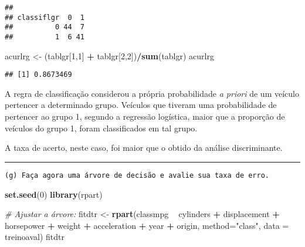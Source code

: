 \documentclass[]{article}
\newenvironment{Shaded}{\begin{snugshade}}{\end{snugshade}}
\newcommand{\KeywordTok}[1]{\textcolor[rgb]{0.13,0.29,0.53}{\textbf{#1}}}
\newcommand{\DataTypeTok}[1]{\textcolor[rgb]{0.13,0.29,0.53}{#1}}
\newcommand{\DecValTok}[1]{\textcolor[rgb]{0.00,0.00,0.81}{#1}}
\newcommand{\StringTok}[1]{\textcolor[rgb]{0.31,0.60,0.02}{#1}}
\newcommand{\CommentTok}[1]{\textcolor[rgb]{0.56,0.35,0.01}{\textit{#1}}}
\newcommand{\OperatorTok}[1]{\textcolor[rgb]{0.81,0.36,0.00}{\textbf{#1}}}
\newcommand{\NormalTok}[1]{#1}
\begin{document}
\begin{verbatim}
##           
## classiflgr  0  1
##          0 44  7
##          1  6 41
\end{verbatim}

\begin{Shaded}
\begin{Highlighting}[]
\NormalTok{acurlrg <-}\StringTok{ }\NormalTok{(tablgr[}\DecValTok{1}\NormalTok{,}\DecValTok{1}\NormalTok{] }\OperatorTok{+}\StringTok{ }\NormalTok{tablgr[}\DecValTok{2}\NormalTok{,}\DecValTok{2}\NormalTok{])}\OperatorTok{/}\KeywordTok{sum}\NormalTok{(tablgr)}
\NormalTok{acurlrg}
\end{Highlighting}
\end{Shaded}

\begin{verbatim}
## [1] 0.8673469
\end{verbatim}

\begin{Shaded}
\end{Shaded}

A regra de classificação considerou a própria probabilidade \emph{a
priori} de um veículo pertencer a determinado grupo. Veículos que
tiveram uma probabilidade de pertencer ao grupo 1, segundo a regressão
logística, maior que a proporção de veículos do grupo 1, foram
classificados em tal grupo.

A taxa de acerto, neste caso, foi maior que o obtido da análise
discriminante.

\begin{center}\rule{0.5\linewidth}{\linethickness}\end{center}

\begin{verbatim}
(g) Faça agora uma árvore de decisão e avalie sua taxa de erro.
\end{verbatim}

\begin{Shaded}
\begin{Highlighting}[]
\KeywordTok{set.seed}\NormalTok{(}\DecValTok{0}\NormalTok{)}
\KeywordTok{library}\NormalTok{(rpart)}

\CommentTok{# Ajustar a árvore:}
\NormalTok{fitdtr <-}\StringTok{ }\KeywordTok{rpart}\NormalTok{(classmpg }\OperatorTok{~}\StringTok{ }\NormalTok{cylinders }\OperatorTok{+}\StringTok{ }\NormalTok{displacement }\OperatorTok{+}\StringTok{ }\NormalTok{horsepower }\OperatorTok{+}\StringTok{ }\NormalTok{weight }\OperatorTok{+}\StringTok{ }\NormalTok{acceleration }\OperatorTok{+}\StringTok{ }\NormalTok{year }\OperatorTok{+}\StringTok{ }\NormalTok{origin,}
             \DataTypeTok{method=}\StringTok{"class"}\NormalTok{, }\DataTypeTok{data =}\NormalTok{ treinoaval)}
\NormalTok{fitdtr}
\end{Highlighting}
\end{Shaded}
\end{document}
